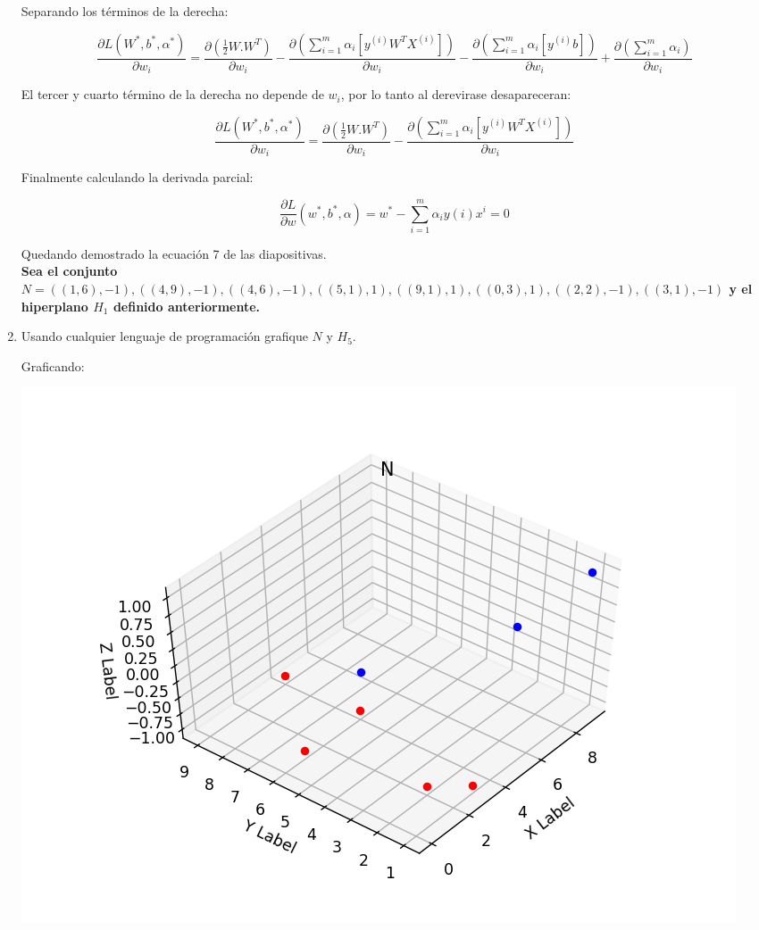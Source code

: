 \documentclass[paper=a4, fontsize=11pt]{scrartcl}
\numberwithin{equation}{section}		%
\numberwithin{figure}{section}			%
\numberwithin{table}{section}				%
\begin{document}
\begin{enumerate}
    Separando los términos de la derecha:
    
    $$\frac{\partial L(W^*, b^*, \alpha^* )}{\partial w_i}=\frac{\partial (\frac{1}{2}W.W^T)}{\partial w_i} - \frac{\partial (\sum_{i=1}^{m}\alpha_i[y^{(i)}W^{T}X^{(i)}])}{\partial w_i} - \frac{\partial (\sum_{i=1}^{m}\alpha_i[y^{(i)}b])}{\partial w_i}+ \frac{\partial (\sum_{i=1}^{m}\alpha_i)}{\partial w_i}$$
    
    El tercer y cuarto término de la derecha no depende de $w_i$, por lo tanto al derevirase desapareceran:
    
    $$\frac{\partial L(W^*, b^*, \alpha^* )}{\partial w_i}=\frac{\partial (\frac{1}{2}W.W^T)}{\partial w_i} - \frac{\partial (\sum_{i=1}^{m}\alpha_i[y^{(i)}W^{T}X^{(i)}])}{\partial w_i}$$
    
    Finalmente calculando la derivada parcial:
    
    $$\frac{\partial L}{\partial w}(w^*, b^*, \alpha) = w^* - \sum_{i=1}^{m}\alpha_iy(i)x^{i}=0$$
    
    Quedando demostrado la ecuación 7 de las diapositivas.\\
    

\textbf{Sea el conjunto $N = {((1,6),-1), ((4,9),-1), ((4,6),-1), ((5,1),1), ((9,1),1), ((0,3),1), ((2,2),-1), ((3,1),-1)}$ y el hiperplano $H_1$ definido anteriormente.}\\

    \item Usando cualquier lenguaje de programación grafique $N$ y $H_5$.
    
    Graficando:
        
    \includegraphics[scale=0.4]{N}
    

\end{enumerate}
\end{document}
